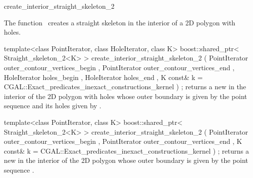 

\begin{ccRefFunction}{create_interior_straight_skeleton_2}


\ccDefinition

The function \ccRefName\ creates a straight skeleton in the interior of a 2D polygon with holes.


\ccFunction
{template<class PointIterator, class HoleIterator, class K>
boost::shared_ptr< Straight_skeleton_2<K> >
create_interior_straight_skeleton_2 ( PointIterator outer_contour_vertices_begin
                                    , PointIterator outer_contour_vertices_end
                                    , HoleIterator  holes_begin
                                    , HoleIterator  holes_end
                                    , K const&      k = CGAL::Exact_predicates_inexact_constructions_kernel
                                    ) ;
}
{returns a new  in the interior of the 2D polygon with holes whose outer boundary is given by the point sequence 
and its holes given by .
}

\ccFunction
{template<class PointIterator, class K>
boost::shared_ptr< Straight_skeleton_2<K> >
create_interior_straight_skeleton_2 ( PointIterator outer_contour_vertices_begin
                                    , PointIterator outer_contour_vertices_end
                                    , K const&      k = CGAL::Exact_predicates_inexact_constructions_kernel
                                    ) ;
}
{returns a new  in the interior of the 2D polygon whose outer boundary is given by the point sequence .
}


\end{ccRefFunction}
